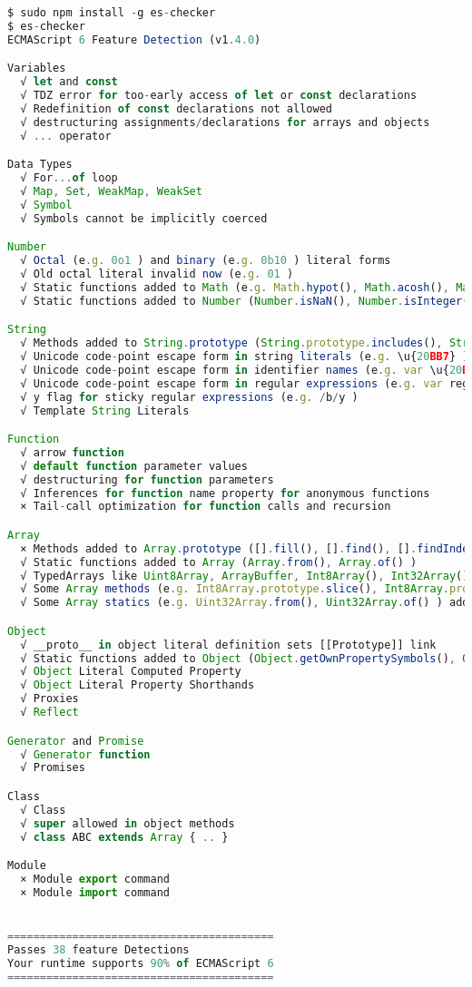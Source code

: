 \begin{lstlisting}[language=JavaScript]
$ sudo npm install -g es-checker
$ es-checker
ECMAScript 6 Feature Detection (v1.4.0)

Variables
  √ let and const
  √ TDZ error for too-early access of let or const declarations
  √ Redefinition of const declarations not allowed
  √ destructuring assignments/declarations for arrays and objects
  √ ... operator

Data Types
  √ For...of loop
  √ Map, Set, WeakMap, WeakSet
  √ Symbol
  √ Symbols cannot be implicitly coerced

Number
  √ Octal (e.g. 0o1 ) and binary (e.g. 0b10 ) literal forms
  √ Old octal literal invalid now (e.g. 01 )
  √ Static functions added to Math (e.g. Math.hypot(), Math.acosh(), Math.imul() )
  √ Static functions added to Number (Number.isNaN(), Number.isInteger() )

String
  √ Methods added to String.prototype (String.prototype.includes(), String.prototype.repeat() )
  √ Unicode code-point escape form in string literals (e.g. \u{20BB7} )
  √ Unicode code-point escape form in identifier names (e.g. var \u{20BB7} = 42; )
  √ Unicode code-point escape form in regular expressions (e.g. var regexp = /\u{20BB7}/u; )
  √ y flag for sticky regular expressions (e.g. /b/y )
  √ Template String Literals

Function
  √ arrow function
  √ default function parameter values
  √ destructuring for function parameters
  √ Inferences for function name property for anonymous functions
  × Tail-call optimization for function calls and recursion

Array
  × Methods added to Array.prototype ([].fill(), [].find(), [].findIndex(), [].entries(), [].keys(), [].values() )
  √ Static functions added to Array (Array.from(), Array.of() )
  √ TypedArrays like Uint8Array, ArrayBuffer, Int8Array(), Int32Array(), Float64Array()
  √ Some Array methods (e.g. Int8Array.prototype.slice(), Int8Array.prototype.join(), Int8Array.prototype.forEach() ) added to the TypedArray prototypes
  √ Some Array statics (e.g. Uint32Array.from(), Uint32Array.of() ) added to the TypedArray constructors

Object
  √ __proto__ in object literal definition sets [[Prototype]] link
  √ Static functions added to Object (Object.getOwnPropertySymbols(), Object.assign() )
  √ Object Literal Computed Property
  √ Object Literal Property Shorthands
  √ Proxies
  √ Reflect

Generator and Promise
  √ Generator function
  √ Promises

Class
  √ Class
  √ super allowed in object methods
  √ class ABC extends Array { .. }

Module
  × Module export command
  × Module import command


=========================================
Passes 38 feature Detections
Your runtime supports 90% of ECMAScript 6
=========================================
\end{lstlisting}


